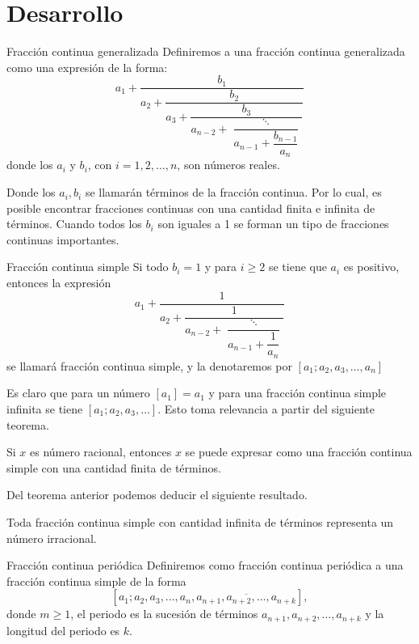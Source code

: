 \section{Desarrollo}

\begin{definition.box}{Fracción continua generalizada}{}
    Definiremos a una fracción continua generalizada como una expresión de la forma:
    \[
        a_1 + \dfrac{b_1}{a_2 + \dfrac{b_2}{a_3 + \dfrac{b_3}{a_{n - 2} + \dfrac{\ddots}{a_{n - 1} + \dfrac{b_{n -1}}{a_n}}}}}
    \]
    donde los $a_i$ y $b_i$, con $i =1,2, \ldots, n$, son números reales.
\end{definition.box}
Donde los $a_i, b_i$ se llamarán términos de la fracción continua.
Por lo cual, es posible encontrar fracciones continuas con una cantidad finita e infinita de términos.
Cuando todos los $b_i$ son iguales a 1 se forman un tipo de fracciones continuas importantes.

\begin{definition.box}{Fracción continua simple}{}
    Si todo $b_i = 1$ y para $i \geq 2$ se tiene que $a_i$ es positivo, entonces la expresión
    \[
        a_1 + \dfrac{1}{a_2 + \dfrac{1}{a_{n - 2} + \dfrac{\ddots}{a_{n - 1} + \dfrac{1}{a_n}}}}
    \]
    se llamará fracción continua simple, y la denotaremos por $[a_1; a_2, a_3, \ldots, a_n]$
\end{definition.box}
Es claro que para un número $[a_1] = a_1$ y para una fracción continua simple infinita se tiene $[a_1; a_2, a_3, \ldots]$.
Esto toma relevancia a partir del siguiente teorema.

\begin{theorem.box}{}{}
    Si $x$ es número racional, entonces $x$ se puede expresar como una fracción continua simple con una cantidad finita de términos.
\end{theorem.box}

Del teorema anterior podemos deducir el siguiente resultado.

\begin{corollary}
    Toda fracción continua simple con cantidad infinita de términos representa un número irracional.
\end{corollary}

\begin{definition.box}{Fracción continua periódica}{}
    Definiremos como fracción continua periódica a una fracción continua simple de la forma
    \[
        [a_1; a_2, a_3, \ldots, a_n, \overline{a_{n + 1}, a_{n + 2},\ldots, a_{n + k}}],
    \]
    donde $m \geq 1$, el periodo es la sucesión de términos $a_{n + 1}, a_{n + 2},\ldots, a_{n + k}$ y la longitud del periodo es $k$.
\end{definition.box}


